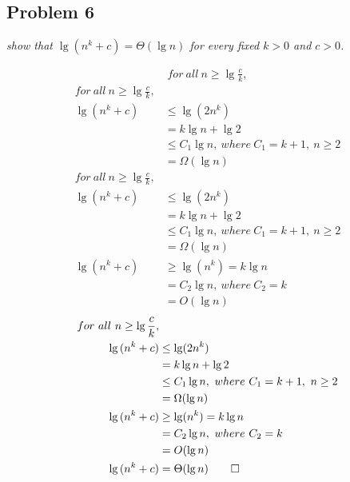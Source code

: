 \documentclass{beamer}
\begin{document}
        
        
    \subsection{Problem 6}
    
        \begin{frame}[c,shrink]{\subsecname}
            \textit{show that $\lg(n^k+c) = \Theta(\lg{n})$ for every fixed $k>0$ and $c>0$.}
            \begin{overprint}
            \begin{align*}
                for\ all\ n \geq \lg{\frac{c}{k}},
            \end{align*}
            \begin{align*}
                for\ all\ n \geq \lg{\frac{c}{k}},&\\
                \lg{(n^k+c)} &\leq \lg(2n^k)\\
                		  &=    k\lg{n}+\lg{2}\\
                		  &\leq C_1\lg{n},\ where\ C_1= k+1,\ n\geq 2\\
                		  &=    \Omega(\lg{n})
            \end{align*}
            \begin{align*}
                for\ all\ n \geq \lg{\frac{c}{k}},&\\
                \lg{(n^k+c)} &\leq \lg(2n^k)\\
                		  &=    k\lg{n}+\lg{2}\\
                		  &\leq C_1\lg{n},\ where\ C_1= k+1,\ n\geq 2\\
                		  &=    \Omega(\lg{n})\\
                \lg{(n^k+c)} &\geq \lg(n^k) = k\lg{n}\\
                		  &= C_2\lg{n},\ where\ C_2= k\\
                		  &= O(\lg{n})
            \end{align*}
            \begin{align*}
                for\ all\ n \geq \lg{\frac{c}{k}},&\\
                \lg{(n^k+c)} &\leq \lg(2n^k)\\
                		  &=    k\lg{n}+\lg{2}\\
                		  &\leq C_1\lg{n},\ where\ C_1= k+1,\ n\geq 2\\
                		  &=    \Omega(\lg{n})\\
                \lg{(n^k+c)} &\geq \lg(n^k) = k\lg{n}\\
                		  &= C_2\lg{n},\ where\ C_2= k\\
                		  &= O(\lg{n})\\
                \lg{(n^k+c)} &= \Theta(\lg{n}) \qed
            \end{align*}
            \end{overprint}
        \end{frame}
        
\end{document}
